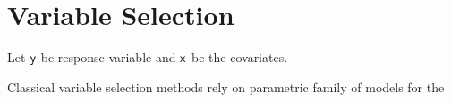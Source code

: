 \documentclass[11pt]{article}
\begin{document}
\section{Variable Selection}

Let $\mathsf{y}$ be response variable and $\mathsf{x}$ be the covariates.

Classical variable selection methods rely on parametric family of models for the 


\newpage
\printbibliography 
\end{document}
